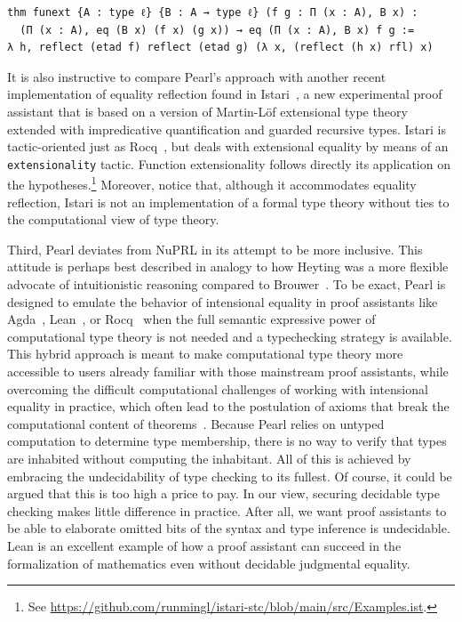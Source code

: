 \documentclass[a4paper]{article}
\begin{document}
\begin{lstlisting}[style=pearl]
thm funext {A : type ℓ} {B : A → type ℓ} (f g : Π (x : A), B x) :
  (Π (x : A), eq (B x) (f x) (g x)) → eq (Π (x : A), B x) f g :=
λ h, reflect (etad f) reflect (etad g) (λ x, (reflect (h x) rfl) x)
\end{lstlisting}

\noindent It is also instructive to compare Pearl's approach with another recent implementation of equality reflection found in  Istari~\cite{istari}, a new experimental proof assistant that is based on a version of Martin-L\"of extensional type theory extended with impredicative quantification and guarded recursive types. Istari is tactic-oriented just as Rocq~\cite{barras1997coq}, but deals with extensional equality by means of an \texttt{extensionality} tactic. Function extensionality follows directly its application on the hypotheses.\footnote{
	See \href{https://github.com/runmingl/istari-stc/blob/main/src/Examples.ist}{https://github.com/runmingl/istari-stc/blob/main/src/Examples.ist}.}
Moreover, notice that, although it accommodates equality reflection, Istari is not an implementation of a formal type theory without ties to the computational view of type theory. 

Third, Pearl deviates from NuPRL in its attempt to be more inclusive. This attitude is perhaps best described in analogy to how Heyting was a more flexible advocate of intuitionistic reasoning compared to Brouwer~\cite{bentzen2025iep}. To be exact, Pearl is designed to emulate the behavior of intensional equality in proof assistants like Agda~\cite{norell2009agda},  Lean~\cite{demoura2021lean}, or Rocq~\cite{barras1997coq} when the full semantic expressive power of computational type theory is not needed and a typechecking strategy is available. 
This hybrid approach is meant to make computational type theory more accessible to users already familiar with those mainstream proof assistants, while overcoming the difficult computational challenges of working with intensional equality in practice, which often lead to the postulation of axioms that break the computational content of theorems~\cite{hottbook}. Because Pearl relies on untyped computation to determine type membership, there is no way to verify that types are inhabited without computing the inhabitant. All of this is achieved by embracing the undecidability of type checking to its fullest. Of course, it could be argued that this is too high a price to pay. In our view, securing decidable type checking makes little difference in practice. After all, we want proof assistants to be able to elaborate omitted bits of the syntax and type inference is undecidable. Lean is an excellent example of how a proof assistant can succeed in the formalization of mathematics even without decidable judgmental equality.
\end{document}
